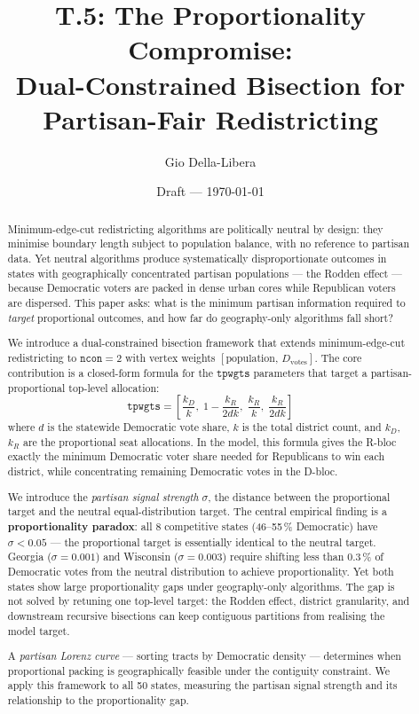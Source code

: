\documentclass[12pt]{article}
\title{T.5: The Proportionality Compromise:\\
Dual-Constrained Bisection for Partisan-Fair Redistricting}
\author{Gio Della-Libera}
\date{Draft --- \today}
\begin{document}
\maketitle

\begin{abstract}
Minimum-edge-cut redistricting algorithms are politically neutral by design:
they minimise boundary length subject to population balance, with no reference
to partisan data.
Yet neutral algorithms produce systematically disproportionate outcomes in
states with geographically concentrated partisan populations --- the Rodden
effect --- because Democratic voters are packed in dense urban cores while
Republican voters are dispersed.
This paper asks: what is the minimum partisan information required to
\emph{target} proportional outcomes, and how far do geography-only
algorithms fall short?

We introduce a dual-constrained bisection framework that extends minimum-edge-cut
redistricting to $\mathtt{ncon}=2$ with vertex weights
$[\text{population},\, D_{\text{votes}}]$.
The core contribution is a closed-form formula for the $\mathtt{tpwgts}$
parameters that target a partisan-proportional top-level allocation:
\[
  \mathtt{tpwgts} = \left[\frac{k_D}{k},\; 1 - \frac{k_R}{2dk},\;
                          \frac{k_R}{k},\; \frac{k_R}{2dk}\right]
\]
where $d$ is the statewide Democratic vote share, $k$ is the total district
count, and $k_D$, $k_R$ are the proportional seat allocations.
In the model, this formula gives the R-bloc exactly the minimum Democratic voter share
needed for Republicans to win each district, while concentrating remaining
Democratic votes in the D-bloc.

We introduce the \emph{partisan signal strength} $\sigma$, the distance between
the proportional target and the neutral equal-distribution target.
The central empirical finding is a \textbf{proportionality paradox}: all 8
competitive states (46--55\,\% Democratic) have $\sigma < 0.05$ --- the
proportional target is essentially identical to the neutral target.
Georgia ($\sigma = 0.001$) and Wisconsin ($\sigma = 0.003$) require shifting
less than 0.3\,\% of Democratic votes from the neutral distribution to achieve
proportionality.
Yet both states show large proportionality gaps under geography-only algorithms.
The gap is not solved by retuning one top-level target: the Rodden effect,
district granularity, and downstream recursive bisections can keep contiguous
partitions from realising the model target.

A \emph{partisan Lorenz curve} --- sorting tracts by Democratic density ---
determines when proportional packing is geographically feasible under the
contiguity constraint.
We apply this framework to all 50 states, measuring the partisan signal strength
and its relationship to the proportionality gap.


\end{abstract}
\end{document}
